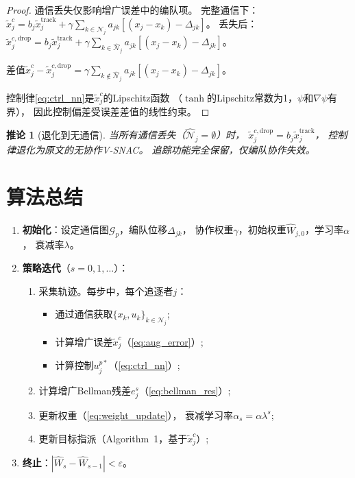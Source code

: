 \documentclass[11pt,a4paper]{article}
\newtheorem{corollary}[theorem]{推论}
\begin{document}
\begin{proof}
  通信丢失仅影响增广误差中的编队项。
  完整通信下：$\tilde{x}_j^c = b_j \tilde{x}_j^{\text{track}}
  + \gamma \sum_{k \in \mathcal{N}_j} a_{jk}[(x_j - x_k) - \Delta_{jk}]$。
  丢失后：$\tilde{x}_j^{c,\text{drop}} = b_j \tilde{x}_j^{\text{track}}
  + \gamma \sum_{k \in \hat{\mathcal{N}}_j} a_{jk}[(x_j - x_k) - \Delta_{jk}]$。

  差值$\tilde{x}_j^c - \tilde{x}_j^{c,\text{drop}}
  = \gamma \sum_{k \notin \hat{\mathcal{N}}_j} a_{jk}[(x_j - x_k) - \Delta_{jk}]$。

  控制律\eqref{eq:ctrl_nn}是$\tilde{x}_j^c$的Lipschitz函数
  （$\tanh$的Lipschitz常数为1，$\psi$和$\nabla\psi$有界），
  因此控制偏差受误差差值的线性约束。
\end{proof}

\begin{corollary}[退化到无通信]
  当所有通信丢失（$\hat{\mathcal{N}}_j = \emptyset$）时，
  $\tilde{x}_j^{c,\text{drop}} = b_j \tilde{x}_j^{\text{track}}$，
  控制律退化为原文的无协作V-SNAC。
  追踪功能完全保留，仅编队协作失效。
\end{corollary}


\section{算法总结}

\begin{enumerate}
  \item \textbf{初始化}：设定通信图$\mathcal{G}_p$，编队位移$\Delta_{jk}$，
    协作权重$\gamma$，初始权重$\hat{W}_{j,0}$，学习率$\alpha$，
    衰减率$\lambda$。
  \item \textbf{策略迭代}（$s = 0, 1, \ldots$）：
  \begin{enumerate}
    \item 采集轨迹。每步中，每个追逐者$j$：
    \begin{itemize}
      \item 通过通信获取$\{x_k, u_k\}_{k \in \mathcal{N}_j}$;
      \item 计算增广误差$\tilde{x}_j^c$（\eqref{eq:aug_error}）;
      \item 计算控制$u_j^{p*}$（\eqref{eq:ctrl_nn}）;
    \end{itemize}
    \item 计算增广Bellman残差$e_j^s$（\eqref{eq:bellman_res}）;
    \item 更新权重（\eqref{eq:weight_update}），
          衰减学习率$\alpha_s = \alpha \lambda^s$;
    \item 更新目标指派（Algorithm~1，基于$\tilde{x}_j^c$）;
  \end{enumerate}
  \item \textbf{终止}：$|\hat{W}_s - \hat{W}_{s-1}| < \varepsilon$。
\end{enumerate}
\end{document}
